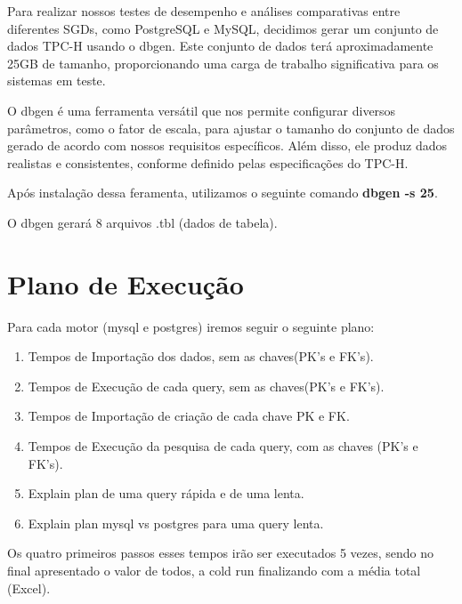\documentclass{article}
\begin{document}
\texttt{}\par Para realizar nossos testes de desempenho e análises comparativas entre diferentes SGDs, como PostgreSQL e MySQL, decidimos gerar um conjunto de dados TPC-H usando o dbgen. Este conjunto de dados terá aproximadamente 25GB de tamanho, proporcionando uma carga de trabalho significativa para os sistemas em teste.\\

\texttt{}\par O dbgen é uma ferramenta versátil que nos permite configurar diversos parâmetros, como o fator de escala, para ajustar o tamanho do conjunto de dados gerado de acordo com nossos requisitos específicos. Além disso, ele produz dados realistas e consistentes, conforme definido pelas especificações do TPC-H.


\texttt{}\par Após instalação dessa feramenta, utilizamos o seguinte comando \textbf{dbgen -s 25}.

\texttt{}\par O dbgen gerará 8 arquivos .tbl (dados de tabela).




\section{Plano de Execução}


\texttt{}\par Para cada motor (mysql e postgres) iremos seguir o seguinte plano:

\begin{enumerate}
    \item Tempos de Importação dos dados, sem as chaves(PK's e FK's).
    \item Tempos de Execução de cada query, sem as chaves(PK's e FK's).
    \item Tempos de Importação de criação de cada chave PK e FK.
    \item Tempos de Execução da pesquisa de cada query, com as chaves (PK's e FK's).
    \item Explain plan de uma query rápida e de uma lenta.
    \item Explain plan mysql vs postgres para uma query lenta.
\end{enumerate}

\texttt{}\par Os quatro primeiros passos esses tempos irão ser executados 5 vezes, sendo no final apresentado o valor de todos, a cold run finalizando com a média total (Excel).\\
\end{document}
